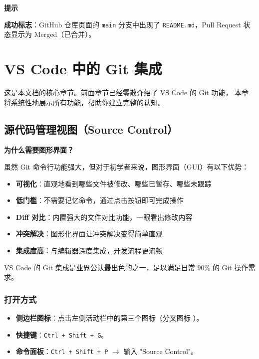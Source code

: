 \documentclass[12pt,a4paper,openany]{ctexbook}
\newenvironment{tipbox}{%
  \medskip
  \noindent\textbf{\faLightbulb\; 提示}
  \smallskip
}{%
  \medskip
}
\begin{document}
\begin{tipbox}
\textbf{成功标志}：GitHub 仓库页面的 \texttt{main} 分支中出现了 \texttt{README.md}，Pull Request 状态显示为 Merged（已合并）。
\end{tipbox}

\chapter{VS Code 中的 Git 集成}

这是本文档的核心章节。前面章节已经零散介绍了 VS Code 的 Git 功能，
本章将系统性地展示所有功能，帮助你建立完整的认知。

\section{源代码管理视图（Source Control）}

\begin{infobox}
\textbf{为什么需要图形界面？}

虽然 Git 命令行功能强大，但对于初学者来说，图形界面（GUI）有以下优势：
\begin{itemize}
  \item \textbf{可视化}：直观地看到哪些文件被修改、哪些已暂存、哪些未跟踪
  \item \textbf{低门槛}：不需要记忆命令，通过点击按钮即可完成操作
  \item \textbf{Diff 对比}：内置强大的文件对比功能，一眼看出修改内容
  \item \textbf{冲突解决}：图形化界面让冲突解决变得简单直观
  \item \textbf{集成度高}：与编辑器深度集成，开发流程更流畅
\end{itemize}

VS Code 的 Git 集成是业界公认最出色的之一，足以满足日常 90\% 的 Git 操作需求。
\end{infobox}

\subsection{打开方式}

\begin{itemize}[leftmargin=2em]
  \item \textbf{侧边栏图标}：点击左侧活动栏中的第三个图标（分叉图标 \faCodeBranch）。
  \item \textbf{快捷键}：\texttt{Ctrl + Shift + G}。
  \item \textbf{命令面板}：\texttt{Ctrl + Shift + P} $\to$ 输入 "Source Control"。
\end{itemize}
\end{document}
